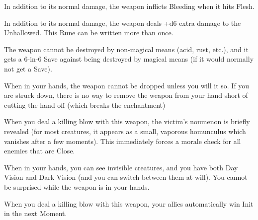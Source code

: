 {In addition to its normal damage, the weapon inflicts Bleeding when it hits Flesh.








In addition to its normal damage, the weapon deals +d6 extra damage to the Unhallowed.  This Rune can be written more than once.



The weapon cannot be destroyed by non-magical means (acid, rust, etc.), and it gets a 6-in-6 Save against being destroyed by magical means (if it would normally not get a Save).


When in your hands, the weapon cannot be dropped unless you will it so.  If you are struck down, there is no way to remove the weapon from your hand short of cutting the hand off (which breaks the enchantment)



When you deal a killing blow with this weapon, the victim's noumenon is briefly revealed (for most creatures, it appears as a small, vaporous homunculus which vanishes after a few moments).  This immediately forces a morale check for all enemies that are Close.



When in your hands, you can see invisible creatures, and you have both Day Vision and Dark Vision (and you can switch between them at will).  You cannot be surprised while the weapon is in your hands.



When you deal a killing blow with this weapon, your allies automatically win Init in the next Moment.


}%
